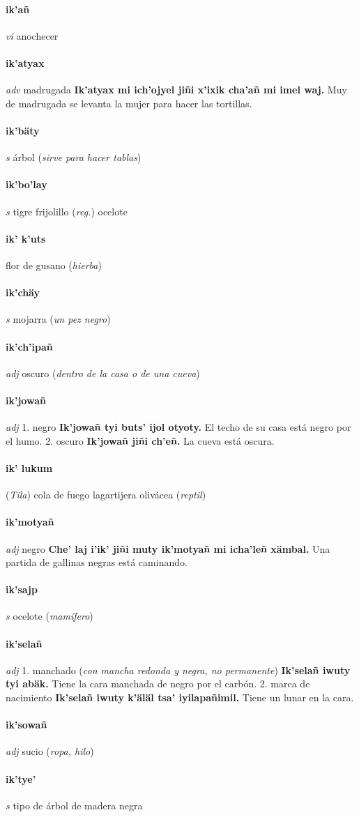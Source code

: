 \documentclass{scrbook}
\newcommand{\entry}[1]{\paragraph{#1}}
\newcommand{\onedefinition}[1]{#1.}
\newcommand{\partofspeech}[1]{\textit{#1}}
\newcommand{\spanishtranslation}[1]{#1}
\newcommand{\clarification}[1]{(\textit{#1})}
\newcommand{\cholexample}[1]{\textbf{#1}}
\newcommand{\exampletranslation}[1]{#1}
\newcommand{\relevantdialect}[1]{(\textit{#1})}
\begin{document}
\begin{multicols}{2}
\entry{ik'añ}
\partofspeech{vi}
\spanishtranslation{anochecer}

\entry{ik'atyax}
\partofspeech{adv}
\spanishtranslation{madrugada}
\cholexample{Ik'atyax mi ich'ojyel jiñi x'ixik cha'añ mi imel waj.}
\exampletranslation{Muy de madrugada se levanta la mujer para hacer las tortillas.}

\entry{ik'bäty}
\partofspeech{s}
\spanishtranslation{árbol}
\clarification{sirve para hacer tablas}

\entry{ik'bo'lay}
\partofspeech{s}
\spanishtranslation{tigre frijolillo}
\clarification{reg.}
\spanishtranslation{ocelote}

\entry{ik' k'uts}
\spanishtranslation{flor de gusano}
\clarification{hierba}

\entry{ik'chäy}
\partofspeech{s}
\spanishtranslation{mojarra}
\clarification{un pez negro}

\entry{ik'ch'ipañ}
\partofspeech{adj}
\spanishtranslation{oscuro}
\clarification{dentro de la casa o de una cueva}

\entry{ik'jowañ}
\partofspeech{adj}
\onedefinition{1}
\spanishtranslation{negro}
\cholexample{Ik'jowañ tyi buts' ijol otyoty.}
\exampletranslation{El techo de su casa está negro por el humo.}
\onedefinition{2}
\spanishtranslation{oscuro}
\cholexample{Ik'jowañ jiñi ch'eñ.}
\exampletranslation{La cueva está oscura.}

\entry{ik' lukum}
\relevantdialect{Tila}
\spanishtranslation{cola de fuego}
\spanishtranslation{lagartijera olivácea}
\clarification{reptil}

\entry{ik'motyañ}
\partofspeech{adj}
\spanishtranslation{negro}
\cholexample{Che' laj i'ik' jiñi muty ik'motyañ mi icha'leñ xämbal.}
\exampletranslation{Una partida de gallinas negras está caminando.}

\entry{ik'sajp}
\partofspeech{s}
\spanishtranslation{ocelote}
\clarification{mamífero}

\entry{ik'selañ}
\partofspeech{adj}
\onedefinition{1}
\spanishtranslation{manchado}
\clarification{con mancha redonda y negra, no permanente}
\cholexample{Ik'selañ iwuty tyi abäk.}
\exampletranslation{Tiene la cara manchada de negro por el carbón.}
\onedefinition{2}
\spanishtranslation{marca de nacimiento}
\cholexample{Ik'selañ iwuty k'äläl tsa' iyilapañimil.}
\exampletranslation{Tiene un lunar en la cara.}

\entry{ik'sowañ}
\partofspeech{adj}
\spanishtranslation{sucio}
\clarification{ropa, hilo}

\entry{ik'tye'}
\partofspeech{s}
\spanishtranslation{tipo de árbol de madera negra}


\end{multicols}
\end{document}
